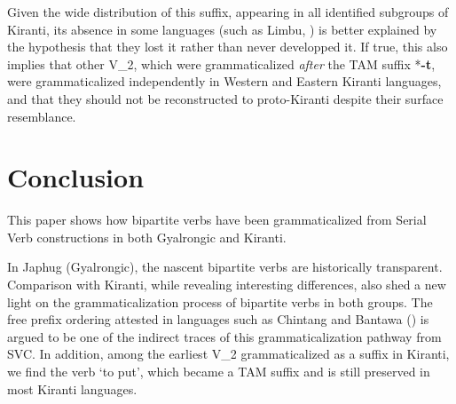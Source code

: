 \documentclass[oneside,a4paper,11pt]{article}
\newcommand{\ipa}[1]{{\phon\textbf{#1}}}
\begin{document}
Given the wide distribution of this suffix, appearing in all identified subgroups of Kiranti, its absence in some languages (such as Limbu, \citealt{driem87}) is better explained by the hypothesis that they lost it rather than never developped it. If true, this also implies that other V_2, which were grammaticalized \textit{after} the TAM suffix *\ipa{-t}, were grammaticalized independently in Western and Eastern Kiranti languages, and that they should not be reconstructed to proto-Kiranti despite their surface resemblance.

\section*{Conclusion}
This paper shows how bipartite verbs have been grammaticalized from Serial Verb constructions in both Gyalrongic and Kiranti. 

In Japhug (Gyalrongic), the nascent bipartite verbs are historically transparent. Comparison with  Kiranti, while revealing interesting differences, also shed a new light on the grammaticalization process of bipartite verbs in both groups. The free prefix ordering attested in languages such as Chintang and Bantawa (\citealt{bickel07chintang}) is argued to be one of the indirect traces of this grammaticalization pathway from SVC. In addition, among the earliest V_2 grammaticalized as a suffix in Kiranti, we find the verb `to put', which became a TAM suffix and is still preserved in most Kiranti languages.




 
\end{document}
